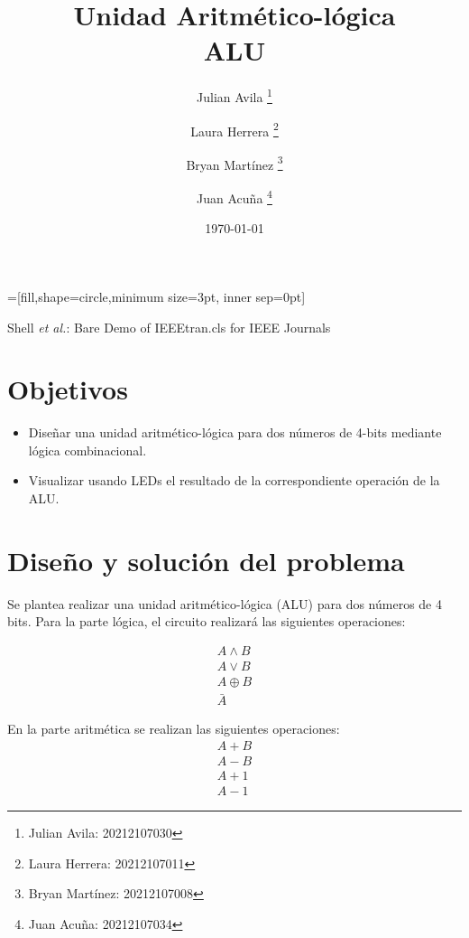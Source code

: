 \documentclass[journal, table]{IEEEtran}
\begin{document}
=[fill,shape=circle,minimum size=3pt, inner sep=0pt]

\title{\textbf{Unidad Aritmético-lógica} \\ \small{ALU}}

\author[*]{Julian Avila
    \thanks{Julian Avila: 20212107030}}
\author[*]{Laura Herrera
    \thanks{Laura Herrera: 20212107011}}
\author[*]{Bryan Martínez
    \thanks{Bryan Martínez: 20212107008}}
\author[*]{Juan Acuña
    \thanks{Juan Acuña: 20212107034}}


\date{\today}

\markboth{}
{Shell \MakeLowercase{\textit{et al.}}: Bare Demo of IEEEtran.cls for IEEE Journals}

\maketitle

\section{Objetivos}
\begin{itemize}
    \item Diseñar una unidad aritmético-lógica para dos números de 4-bits mediante lógica combinacional.
    \item Visualizar usando LEDs el resultado de la correspondiente operación de la ALU.
\end{itemize}

\section{Diseño y solución del problema}
Se plantea realizar una unidad aritmético-lógica (ALU) para dos números de 4 bits.
Para la parte lógica, el circuito realizará las siguientes operaciones:

\begin{gather}
    A \land B \\
    A \lor B \\
    A \oplus B \\
    \bar{A}
\end{gather}

En la parte aritmética se realizan las siguientes operaciones:
\begin{gather}
    A+B \\
    A-B \\
    A+1 \\
    A-1
\end{gather}
\end{document}
